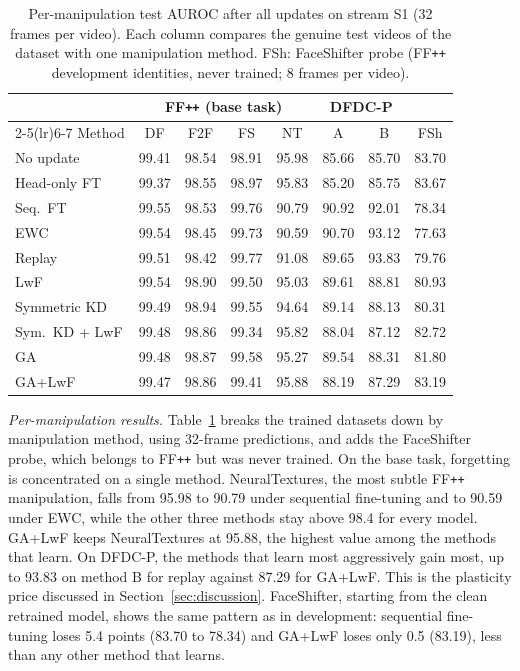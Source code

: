 \documentclass[journal]{IEEEtran}
\newcommand{\ffpp}{FF\texttt{++}}
\begin{document}
\begin{table}[t]
\caption{Per-manipulation test AUROC after all updates on stream S1 (32 frames per video). Each column compares the genuine test videos of the dataset with one manipulation method. FSh: FaceShifter probe (\ffpp{} development identities, never trained; 8 frames per video).}
\label{tab:permanip}
\centering
\footnotesize
\setlength{\tabcolsep}{2.7pt}
\begin{tabular}{@{}lccccccc@{}}
\toprule
& \multicolumn{4}{c}{\ffpp{} (base task)} & \multicolumn{2}{c}{DFDC-P} & \\
\cmidrule(lr){2-5}\cmidrule(lr){6-7}
Method & DF & F2F & FS & NT & A & B & FSh \\
\midrule
No update & 99.41 & 98.54 & 98.91 & 95.98 & 85.66 & 85.70 & 83.70 \\
Head-only FT & 99.37 & 98.55 & 98.97 & 95.83 & 85.20 & 85.75 & 83.67 \\
Seq.\ FT & 99.55 & 98.53 & 99.76 & 90.79 & 90.92 & 92.01 & 78.34 \\
EWC & 99.54 & 98.45 & 99.73 & 90.59 & 90.70 & 93.12 & 77.63 \\
Replay & 99.51 & 98.42 & 99.77 & 91.08 & 89.65 & 93.83 & 79.76 \\
LwF & 99.54 & 98.90 & 99.50 & 95.03 & 89.61 & 88.81 & 80.93 \\
Symmetric KD & 99.49 & 98.94 & 99.55 & 94.64 & 89.14 & 88.13 & 80.31 \\
Sym.\ KD + LwF & 99.48 & 98.86 & 99.34 & 95.82 & 88.04 & 87.12 & 82.72 \\
GA & 99.48 & 98.87 & 99.58 & 95.27 & 89.54 & 88.31 & 81.80 \\
GA+LwF & 99.47 & 98.86 & 99.41 & 95.88 & 88.19 & 87.29 & 83.19 \\
\bottomrule
\end{tabular}
\end{table}

\textit{Per-manipulation results.} Table~\ref{tab:permanip} breaks the trained datasets down by manipulation method, using 32-frame predictions, and adds the FaceShifter probe, which belongs to \ffpp{} but was never trained. On the base task, forgetting is concentrated on a single method. NeuralTextures, the most subtle \ffpp{} manipulation, falls from 95.98 to 90.79 under sequential fine-tuning and to 90.59 under EWC, while the other three methods stay above 98.4 for every model. GA+LwF keeps NeuralTextures at 95.88, the highest value among the methods that learn. On DFDC-P, the methods that learn most aggressively gain most, up to 93.83 on method B for replay against 87.29 for GA+LwF. This is the plasticity price discussed in Section~\ref{sec:discussion}. FaceShifter, starting from the clean retrained model, shows the same pattern as in development: sequential fine-tuning loses 5.4 points (83.70 to 78.34) and GA+LwF loses only 0.5 (83.19), less than any other method that learns.
\end{document}

